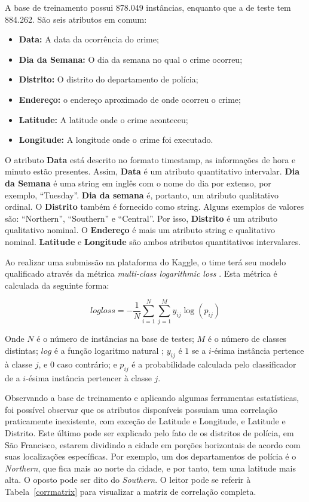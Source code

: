 \documentclass[conference]{IEEEtran}
\begin{document}
A base de treinamento possui 878.049 instâncias, enquanto que a de teste tem 
884.262. São seis atributos em comum:

\begin{itemize}
	\item \textbf{Data:} A data da ocorrência do crime;
	\item \textbf{Dia da Semana:} O dia da semana no qual o crime ocorreu;
	\item \textbf{Distrito:} O distrito do departamento de polícia;
	\item \textbf{Endereço:} o endereço aproximado de onde ocorreu o crime;
	\item \textbf{Latitude:} A latitude onde o crime aconteceu;
	\item \textbf{Longitude:} A longitude onde o crime foi executado.
\end{itemize}


O atributo \textbf{Data} está descrito no formato timestamp, as informações de 
hora e minuto estão presentes. Assim, \textbf{Data} é um atributo quantitativo 
intervalar. \textbf{Dia da Semana} é uma string em inglês com o nome do dia por 
extenso, por exemplo, “Tuesday”. \textbf{Dia da semana} é, portanto, um atributo 
qualitativo ordinal. O \textbf{Distrito} também é fornecido como string. Alguns 
exemplos de valores são: “Northern”, “Southern” e “Central”. Por isso, 
\textbf{Distrito} é um atributo qualitativo nominal. O \textbf{Endereço} é mais 
um atributo string e qualitativo nominal. \textbf{Latitude} e \textbf{Longitude} 
são ambos atributos quantitativos intervalares.

Ao realizar uma submissão na plataforma do Kaggle, o time terá seu modelo 
qualificado através da métrica \textit{multi-class logarithmic loss} 
\cite{logloss}. Esta métrica é calculada da seguinte forma:

$$ logloss = -\frac{1}{N}\sum_{i=1}^N\sum_{j=1}^My_{ij}\log(p_{ij}) $$

Onde $N$ é o número de instâncias na base de testes; $M$ é o número de classes 
distintas; $log$ é a função logaritmo natural \cite{naturallog}; $y_{ij}$ é $1$ 
se a $i$-ésima instância pertence à classe $j$, e $0$ caso contrário; e $p_{ij}$ 
é a probabilidade calculada pelo classificador de a $i$-ésima instância 
pertencer à classe $j$.

Observando a base de treinamento e aplicando algumas ferramentas estatísticas, 
foi possível observar que os atributos disponíveis possuiam uma correlação 
praticamente inexistente, com exceção de Latitude e Longitude, e Latitude e 
Distrito. Este último pode ser explicado pelo fato de os distritos de polícia, 
em São Francisco, estarem dividindo a cidade em porções horizontais de acordo 
com suas localizações específicas. Por exemplo, um dos departamentos de polícia 
é o \textit{Northern}, que fica mais ao norte da cidade, e por tanto, tem uma 
latitude mais alta. O oposto pode ser dito do \textit{Southern}. O leitor pode 
se referir à Tabela~\ref{corrmatrix} para visualizar a matriz de correlação 
completa.
\end{document}
